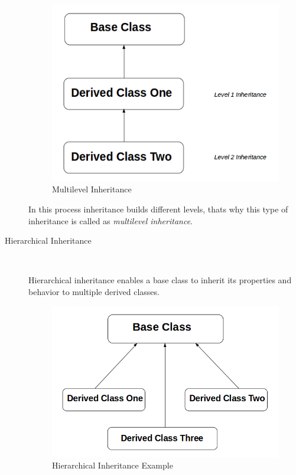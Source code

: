 \documentclass[11pt,a4paper]{article}
\begin{document}
\begin{description}
\begin{figure}[H] 
\begin{center}
   \includegraphics[scale=.35]{multilevel_inheritance.png}
   \caption{Multilevel Inheritance}
\end{center}
\end{figure}
 
In this process inheritance builds different levels, thats why this type of inheritance is called as \emph{multilevel inheritance}.
 
 
 \item[Hierarchical Inheritance]\
 
 Hierarchical inheritance enables a base class to inherit its properties and behavior to multiple derived classes.
 
\begin{figure}[H] 
\begin{center}
  \includegraphics[scale=.35]{hierarchical_inheritance.png}
   \caption{Hierarchical Inheritance Example}
\end{center}
\end{figure}
 
 \end{description}
 
\end{document}
